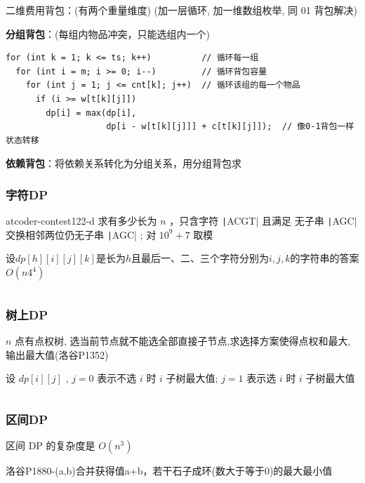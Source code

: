\documentclass[twocolumn,10pt]{ctexart}
\newcommand{\cds}[1]{\ding{\numexpr191+#1\relax}}
\begin{document}
二维费用背包：(有两个重量维度) (加一层循环, 加一维数组枚举, 同 01 背包解决)

\textbf{分组背包}：(每组内物品冲突，只能选组内一个)

\begin{verbatim}
for (int k = 1; k <= ts; k++)          // 循环每一组
  for (int i = m; i >= 0; i--)         // 循环背包容量
    for (int j = 1; j <= cnt[k]; j++)  // 循环该组的每一个物品
      if (i >= w[t[k][j]])
        dp[i] = max(dp[i],
                    dp[i - w[t[k][j]]] + c[t[k][j]]);  // 像0-1背包一样状态转移
\end{verbatim}

\textbf{依赖背包}：将依赖关系转化为分组关系，用分组背包求

\subsubsection{字符DP}

\begin{notebox}
atcoder-contest122-d 求有多少长为 $n$ ，只含字符 \texttt|ACGT| 且满足 \cds{1}无子串 \texttt|AGC| \cds{2} 交换相邻两位仍无子串 \texttt|AGC| ; 对 $10^9+7$ 取模
\end{notebox}

设$dp[h][i][j][k]$是长为$h$且最后一、二、三个字符分别为$i,j,k$的字符串的答案 $O(n4^4)$

\inputminted{cpp}{code/ext_053.cpp}

\subsubsection{树上DP}

\begin{notebox}
$n$ 点有点权树, 选当前节点就不能选全部直接子节点,求选择方案使得点权和最大,输出最大值(洛谷P1352)
\end{notebox}

设 $dp[i][j]$ , $j=0$ 表示不选 $i$ 时 $i$ 子树最大值; $j=1$ 表示选 $i$ 时 $i$ 子树最大值

\inputminted{cpp}{code/p1352_dp_on_tree.cpp}

\subsubsection{区间DP}

区间 DP 的复杂度是 $O(n^3)$

\begin{notebox}
洛谷P1880-(a,b)合并获得值a+b，若干石子成环(数大于等于0)的最大最小值
\end{notebox}
\end{document}
